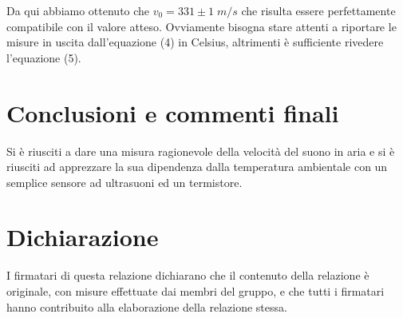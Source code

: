 \documentclass[10pt, a4paper, italian]{article}
\begin{document}
Da qui abbiamo ottenuto che $v_0 =331 \pm 1 \; m/s$ che risulta essere perfettamente compatibile con il valore atteso. Ovviamente bisogna stare attenti a riportare le misure in uscita dall'equazione (4) in Celsius, altrimenti è sufficiente rivedere l'equazione (5).
\section*{Conclusioni e commenti finali}
Si è riusciti a dare una misura ragionevole della velocità del suono in aria
e si è riusciti ad apprezzare la sua dipendenza dalla temperatura ambientale
con un semplice sensore ad ultrasuoni ed un termistore.

\section*{Dichiarazione}
I firmatari di questa relazione dichiarano che il contenuto della relazione \`e
originale, con misure effettuate dai membri del gruppo, e che tutti i firmatari
hanno contribuito alla elaborazione della relazione stessa.
\end{document}
